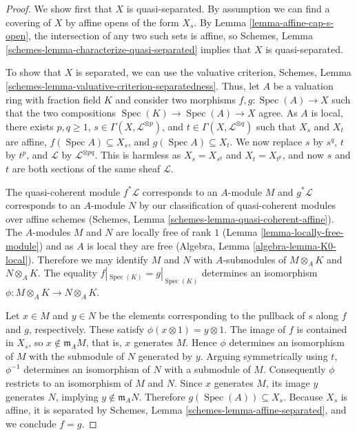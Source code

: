 \documentclass{stacks-project}
\theoremstyle{plain}
\theoremstyle{definition}
\theoremstyle{remark}
\numberwithin{equation}{subsection}
\def\Spec{\mathop{\mathrm{Spec}}}
\begin{document}
\begin{proof}
We show first that $X$ is quasi-separated.  By assumption we
can find a covering of $X$ by affine opens of the form
$X_s$.  By Lemma \ref{lemma-affine-cap-s-open}, the
intersection of any two such sets is affine, so Schemes, Lemma
\ref{schemes-lemma-characterize-quasi-separated} implies
that $X$ is quasi-separated.

\medskip\noindent
To show that $X$ is separated, we can use the valuative
criterion, Schemes, Lemma
\ref{schemes-lemma-valuative-criterion-separatedness}.
Thus, let $A$ be a valuation ring with fraction field $K$
and consider two morphisms $f, g : \Spec(A) \to X$ such that
the two compositions $\Spec(K) \to \Spec(A) \to X$ agree.
As $A$ is local, there exists $p, q \ge 1$, $s \in \Gamma(X,
\mathcal{L}^{\otimes p})$, and $t \in \Gamma(X,
\mathcal{L}^{\otimes q})$ such that $X_s$ and $X_t$ are
affine, $f(\Spec A) \subseteq X_s$, and $g(\Spec A)
\subseteq X_t$.  We now replace $s$ by $s^q$, $t$ by $t^p$,
and $\mathcal{L}$ by $\mathcal{L}^{\otimes pq}$.  This is
harmless as $X_s = X_{s^q}$ and $X_t = X_{t^p}$, and now $s$
and $t$ are both sections of the same sheaf $\mathcal{L}$.

\medskip\noindent
The quasi-coherent module $f^*\mathcal{L}$ corresponds to an $A$-module $M$ and
$g^*\mathcal{L}$ corresponds to an $A$-module $N$ by our
classification of quasi-coherent modules over affine schemes
(Schemes, Lemma \ref{schemes-lemma-quasi-coherent-affine}).
The $A$-modules $M$ and $N$ are locally free of rank
$1$ (Lemma \ref{lemma-locally-free-module}) and as $A$ is
local they are free (Algebra, Lemma
\ref{algebra-lemma-K0-local}).  Therefore we may identify
$M$ and $N$ with $A$-submodules of $M \otimes_A K$ and $N
\otimes_A K$.  The equality $f|_{\Spec(K)} = g|_{\Spec(K)}$
determines an isomorphism $\phi \colon M \otimes_A K \to N
\otimes_A K$.

\medskip\noindent
Let $x \in M$ and $y \in N$ be the elements corresponding to
the pullback of $s$ along $f$ and $g$, respectively.  These
satisfy $\phi(x \otimes 1) = y \otimes 1$.  The image of $f$
is contained in $X_s$, so $x \not\in \mathfrak{m}_A M$, that
is, $x$ generates $M$.  Hence $\phi$ determines an
isomorphism of $M$ with the submodule of $N$ generated by
$y$.  Arguing symmetrically using $t$, $\phi^{-1}$
determines an isomorphism of $N$ with a submodule of $M$.
Consequently $\phi$ restricts to an isomorphism of $M$ and
$N$.  Since $x$ generates $M$, its image $y$ generates
$N$, implying $y \not\in \mathfrak{m}_A N$.  Therefore
$g(\Spec(A)) \subseteq X_s$.  Because $X_s$ is affine, it is
separated by Schemes, Lemma \ref{schemes-lemma-affine-separated},
and we conclude $f = g$.
\end{proof}
\end{document}
